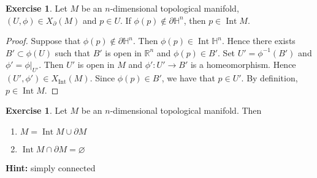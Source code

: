\documentclass{book}
\theoremstyle{definition}
\newtheorem{ex}[definition]{Exercise}
\renewcommand{\H}{\mathbb{H}}
\newcommand{\R}{\mathbb{R}}
\DeclareMathOperator{\Int}{Int}
\DeclareMathOperator*{\0}{\mbf{0}}
\DeclareMathOperator*{\1}{\mbf{1}}
\newcommand{\p}{\partial}
\begin{document}
	\begin{ex}
		Let $M$ be an $n$-dimensional topological manifold, $(U, \phi) \in X_{\p}(M)$ and $p \in U$. If $\phi(p) \not \in \p \H^n$, then $p \in \Int M$.
	\end{ex}

	\begin{proof}
		Suppose that $\phi(p) \not \in \p \H^n$.  Then  $\phi(p) \in \Int \H^n$. Hence there exists $B' \subset \phi(U)$ such that $B'$ is open in $\R^n$ and $\phi(p) \in B'$. Set $U' = \phi^{-1}(B')$ and $\phi' = \phi|_{U'}$. Then $U'$ is open in $M$ and $\phi': U' \rightarrow B'$ is a homeomorphism. Hence $(U', \phi') \in X_{\Int}(M)$. Since $\phi(p) \in B'$, we have that $p \in U'$. By definition, $p \in \Int M$.
	\end{proof}

	\begin{ex}
		Let $M$ be an $n$-dimensional topological manifold. Then 
		\begin{enumerate}
			\item $M = \Int M \cup \p M $
			\item $\Int M \cap \p M = \varnothing$
		\end{enumerate}
		\textbf{Hint:} simply connected
	\end{ex}
\end{document}
